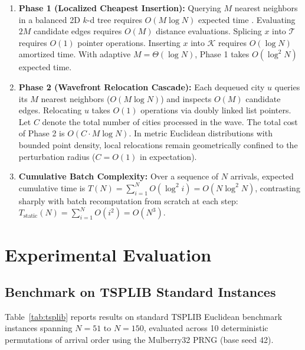 \documentclass[11pt,a4paper]{article}
\theoremstyle{definition}
\begin{document}
\begin{enumerate}
    \item \textbf{Phase 1 (Localized Cheapest Insertion):}
    Querying $M$ nearest neighbors in a balanced 2D $k$-d tree requires $O(M \log N)$ expected time \cite{bentley1975multidimensional}. Evaluating $2M$ candidate edges requires $O(M)$ distance evaluations. Splicing $x$ into $\mathcal{T}$ requires $O(1)$ pointer operations. Inserting $x$ into $\mathcal{K}$ requires $O(\log N)$ amortized time. With adaptive $M = \Theta(\log N)$, Phase 1 takes $O(\log^2 N)$ expected time.
    \item \textbf{Phase 2 (Wavefront Relocation Cascade):}
    Each dequeued city $u$ queries its $M$ nearest neighbors ($O(M \log N)$) and inspects $O(M)$ candidate edges. Relocating $u$ takes $O(1)$ operations via doubly linked list pointers. Let $C$ denote the total number of cities processed in the wave. The total cost of Phase 2 is $O(C \cdot M \log N)$. In metric Euclidean distributions with bounded point density, local relocations remain geometrically confined to the perturbation radius ($C = O(1)$ in expectation).
    \item \textbf{Cumulative Batch Complexity:} Over a sequence of $N$ arrivals, expected cumulative time is $T(N) = \sum_{i=1}^N O(\log^2 i) = O(N \log^2 N)$, contrasting sharply with batch recomputation from scratch at each step: $T_{\text{static}}(N) = \sum_{i=1}^N O(i^2) = O(N^3)$.
\end{enumerate}

\section{Experimental Evaluation}

\subsection{Benchmark on TSPLIB Standard Instances}

Table~\ref{tab:tsplib} reports results on standard TSPLIB Euclidean benchmark instances spanning $N = 51$ to $N = 150$, evaluated across 10 deterministic permutations of arrival order using the Mulberry32 PRNG (base seed 42).
\end{document}
